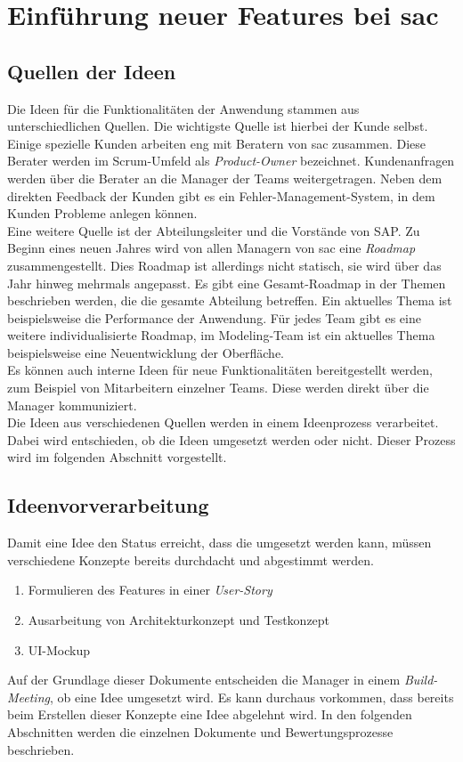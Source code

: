 \section{Einführung neuer Features bei \ac{sac}}\label{sec:feature}

\subsection{Quellen der Ideen}
Die Ideen für die Funktionalitäten der Anwendung stammen aus unterschiedlichen Quellen. Die wichtigste Quelle ist hierbei der Kunde selbst. 
Einige spezielle Kunden arbeiten eng mit Beratern von \ac{sac} zusammen. Diese Berater werden im Scrum-Umfeld als \textit{Product-Owner} bezeichnet. 
Kundenanfragen werden über die Berater an die Manager der Teams weitergetragen. Neben dem direkten Feedback der Kunden gibt es ein 
Fehler-Management-System, in dem Kunden Probleme anlegen können.\\
Eine weitere Quelle ist der Abteilungsleiter und die Vorstände von SAP. Zu Beginn eines neuen Jahres wird von allen Managern von \ac{sac}
eine \textit{Roadmap} zusammengestellt. Dies Roadmap ist allerdings nicht statisch, sie wird über das Jahr hinweg mehrmals angepasst. 
Es gibt eine Gesamt-Roadmap in der Themen beschrieben werden, die die gesamte Abteilung betreffen. Ein aktuelles Thema ist beispielsweise
die Performance der Anwendung. Für jedes Team gibt es eine weitere individualisierte Roadmap, im Modeling-Team ist ein aktuelles Thema beispielsweise 
eine Neuentwicklung der Oberfläche.\\
Es können auch interne Ideen für neue Funktionalitäten bereitgestellt werden, zum Beispiel von Mitarbeitern einzelner Teams.
Diese werden direkt über die Manager kommuniziert.\\
Die Ideen aus verschiedenen Quellen werden in einem Ideenprozess verarbeitet. Dabei wird entschieden, ob die Ideen umgesetzt werden oder nicht. Dieser Prozess
wird im folgenden Abschnitt vorgestellt.

\subsection{Ideenvorverarbeitung}
Damit eine Idee den Status erreicht, dass die umgesetzt werden kann, müssen verschiedene Konzepte bereits durchdacht und abgestimmt werden. 
\begin{enumerate}
    \item Formulieren des Features in einer \textit{User-Story}
    \item Ausarbeitung von Architekturkonzept und Testkonzept
    \item UI-Mockup
\end{enumerate}
Auf der Grundlage dieser Dokumente entscheiden die Manager in einem \textit{Build-Meeting}, ob eine Idee 
umgesetzt wird. Es kann durchaus vorkommen, dass bereits beim Erstellen dieser Konzepte eine Idee abgelehnt wird. In den folgenden Abschnitten werden
die einzelnen Dokumente und Bewertungsprozesse beschrieben.

